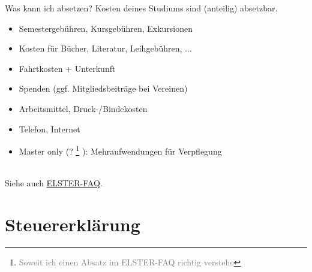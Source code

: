 \documentclass{beamer}
\newcommand{\n}{\hfill\\\vspace{0.25cm}}
\let\oldfootnote\footnote
\renewcommand{\footnote}[1]
{%
	\oldfootnote
	{
		\tiny
		\textcolor{gray}{#1}
	}%
}
\begin{document}
		\begin{frame}{Was kann ich absetzen?}
			Kosten deines Studiums sind (anteilig) absetzbar.\n
			\begin{itemize}
				\item Semestergebühren, Kursgebühren, Exkursionen
				\item Kosten für Bücher, Literatur, Leihgebühren, ...
				\item Fahrtkosten + Unterkunft
				\item Spenden (ggf. Mitgliedsbeiträge bei Vereinen)
				\item Arbeitsmittel, Druck-/Bindekosten
				\item Telefon, Internet
				\item Master only (?\footnote{Soweit ich einen Absatz im ELSTER-FAQ richtig verstehe}): Mehraufwendungen für Verpflegung
			\end{itemize}\n
			Siehe auch \href{https://www.elster.de/eportal/helpGlobal?themaGlobal=help_est_ufa_10_2020}{ELSTER-FAQ}.
		\end{frame}
	
	\section{Steuererklärung}
	
		\begin{frame}
		\end{frame}
	
\end{document}
